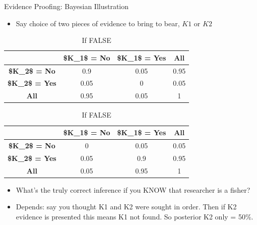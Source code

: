 \documentclass[
  11pt,
  ignorenonframetext,
]{beamer}
\providecommand{\tightlist}{%
  \setlength{\itemsep}{0pt}\setlength{\parskip}{0pt}}\usepackage{longtable,booktabs,array}
\begin{document}
\begin{frame}{Evidence Proofing: Bayesian Illustration}
\protect\hypertarget{evidence-proofing-bayesian-illustration-1}{}
\begin{itemize}
\tightlist
\item
  Say choice of two pieces of evidence to bring to bear, \(K1\) or
  \(K2\)
\end{itemize}

\begin{table}

\caption{Likelihoods}\begin{minipage}[t]{0.50\linewidth}
\subcaption{\label{tbl-anonymous-7755824-1}}

{\centering 

\caption{If TRUE }\tabularnewline

\centering
\begin{tabular}{>{}c|c|c|c}
\hline
 & \$K\_1\$ = No & \$K\_1\$ = Yes & All\\
\hline
\textbf{\$K\_2\$ = No} & 0.9 & 0.05 & 0.95\\
\hline
\textbf{\$K\_2\$ = Yes} & 0.05 & 0 & 0.05\\
\hline
\textbf{All} & 0.95 & 0.05 & 1\\
\hline
\end{tabular}

}

\end{minipage}%
%
\begin{minipage}[t]{0.50\linewidth}
\subcaption{\label{tbl-anonymous-7755824-2}}

{\centering 

\caption{If FALSE }\tabularnewline

\centering
\begin{tabular}{>{}c|c|c|c}
\hline
 & \$K\_1\$ = No & \$K\_1\$ = Yes & All\\
\hline
\textbf{\$K\_2\$ = No} & 0 & 0.05 & 0.05\\
\hline
\textbf{\$K\_2\$ = Yes} & 0.05 & 0.9 & 0.95\\
\hline
\textbf{All} & 0.05 & 0.95 & 1\\
\hline
\end{tabular}

}

\end{minipage}%

\end{table}

\begin{itemize}
\tightlist
\item
  What's the truly correct inference if you KNOW that researcher is a
  fisher?
\item
  Depends: say you thought K1 and K2 were sought in order. Then if K2
  evidence is presented this means K1 not found. So posterior
  \textbar K2 only = 50\%.
\end{itemize}
\end{frame}
\end{document}
